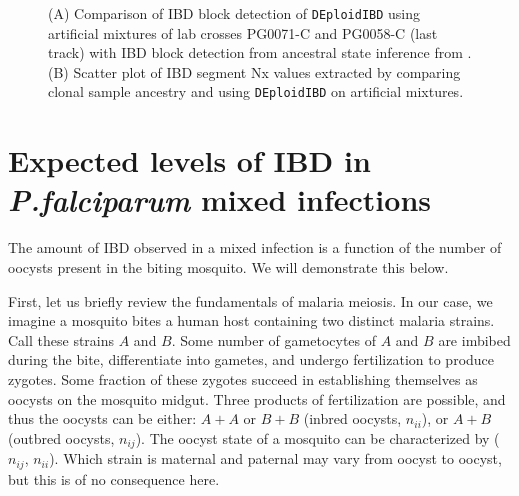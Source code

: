 \documentclass[9pt,lineno]{elife}
\begin{document}
\begin{figure}[ht]
  \centering{}
  \caption{(A) Comparison of IBD block detection of {\tt DEploidIBD} using artificial mixtures of lab crosses PG0071-C and PG0058-C (last track) with IBD block detection from ancestral state inference from \citet{Li2003}. (B) Scatter plot of IBD segment Nx values extracted by comparing clonal sample ancestry and using {\tt DEploidIBD} on artificial mixtures.}\label{fig:bgibd}
\end{figure}

\newpage
\FloatBarrier
\section{Expected levels of IBD in \textit{ P.falciparum } mixed infections}

The amount of IBD observed in a mixed infection is a function of the number of oocysts present in the biting mosquito. We will demonstrate this below.

First, let us briefly review the fundamentals of malaria meiosis. In our case, we imagine a mosquito bites a human host containing two distinct malaria strains. Call these strains $A$ and $B$. Some number of gametocytes of $A$ and $B$ are imbibed during the bite, differentiate into gametes, and undergo fertilization to produce zygotes. Some fraction of these zygotes succeed in establishing themselves as oocysts on the mosquito midgut. Three products of fertilization are possible, and thus the oocysts can be either: $A+A$ or $B+B$ (inbred oocysts, $n_{ii}$), or $A+B$ (outbred oocysts, $n_{ij}$). The oocyst state of a mosquito can be characterized by ($n_{ij}$, $n_{ii}$). Which strain is maternal and paternal may vary from oocyst to oocyst, but this is of no consequence here.
\end{document}
